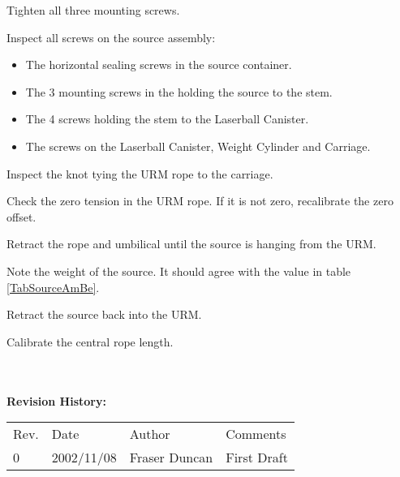 \begin{enumerate}
\checkitem Tighten all three mounting screws.

\checkitem Inspect all screws on the source assembly:
  \begin{itemize}
  \item The horizontal sealing screws in the source container.
  \item The 3 mounting screws in the holding the source to the stem.
  \item The 4 screws holding the stem to the Laserball Canister.
  \item The screws on the Laserball Canister, Weight Cylinder and
     Carriage.
  \end{itemize}

\checkitem Inspect the knot tying the URM rope to the carriage.

\checkitem Check the zero tension in the URM rope.  If it is not zero,
  recalibrate the zero offset.

\checkitem Retract the rope and umbilical until the source is hanging
  from the URM.
 
\checkitem Note the weight of the source.  It should agree with the
  value in table \ref{TabSourceAmBe}.

\checkitem Retract the source back into the URM.

\checkitem Calibrate the central rope length.




\end{enumerate}



{\small
~\\
~\\
\noindent
{\bf Revision History:}\\
\begin{tabular}{llll}
Rev. & Date & Author & Comments\\

0             & 
2002/11/08    & 
Fraser Duncan &
\parbox[t]{3.0in}{
  First Draft
}
\end{tabular}
}






\newpage
\markright{\standardheader}



